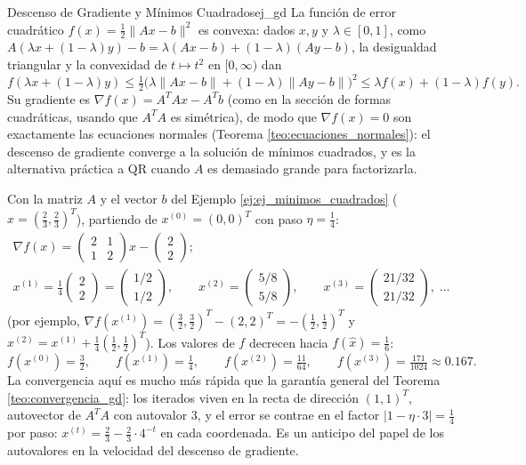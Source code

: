 \documentclass[11pt, a4paper]{article}
\begin{document}
\begin{ejemplo}{Descenso de Gradiente y Mínimos Cuadrados}{ej_gd}
La función de error cuadrático $f(x) = \frac{1}{2} \|Ax - b\|^2$ es convexa: dados $x, y$ y $\lambda \in [0,1]$, como $A(\lambda x + (1-\lambda) y) - b = \lambda (Ax - b) + (1-\lambda)(Ay - b)$, la desigualdad triangular y la convexidad de $t \mapsto t^2$ en $[0, \infty)$ dan
\[
f(\lambda x + (1-\lambda) y) \le \tfrac{1}{2} \big( \lambda \|Ax - b\| + (1-\lambda) \|Ay - b\| \big)^2 \le \lambda f(x) + (1-\lambda) f(y).
\]
Su gradiente es $\nabla f(x) = A^T A x - A^T b$ (como en la sección de formas cuadráticas, usando que $A^T A$ es simétrica), de modo que $\nabla f(x) = 0$ son exactamente las ecuaciones normales (Teorema \ref{teo:ecuaciones_normales}): el descenso de gradiente converge a la solución de mínimos cuadrados, y es la alternativa práctica a QR cuando $A$ es demasiado grande para factorizarla.

Con la matriz $A$ y el vector $b$ del Ejemplo \ref{ej:ej_minimos_cuadrados} ($\hat{x} = (\frac{2}{3}, \frac{2}{3})^T$), partiendo de $x^{(0)} = (0,0)^T$ con paso $\eta = \frac{1}{4}$:
\begin{gather*}
\nabla f(x) = \begin{pmatrix} 2 & 1 \\ 1 & 2 \end{pmatrix} x - \begin{pmatrix} 2 \\ 2 \end{pmatrix};
\\
x^{(1)} = \tfrac{1}{4} \begin{pmatrix} 2 \\ 2 \end{pmatrix} = \begin{pmatrix} 1/2 \\ 1/2 \end{pmatrix}, \qquad
x^{(2)} = \begin{pmatrix} 5/8 \\ 5/8 \end{pmatrix}, \qquad
x^{(3)} = \begin{pmatrix} 21/32 \\ 21/32 \end{pmatrix}, \; \dots
\end{gather*}
(por ejemplo, $\nabla f(x^{(1)}) = (\frac{3}{2}, \frac{3}{2})^T - (2,2)^T = -(\frac{1}{2}, \frac{1}{2})^T$ y $x^{(2)} = x^{(1)} + \frac{1}{4} (\frac{1}{2}, \frac{1}{2})^T$). Los valores de $f$ decrecen hacia $f(\hat{x}) = \frac{1}{6}$:
\[
f(x^{(0)}) = \tfrac{3}{2}, \qquad f(x^{(1)}) = \tfrac{1}{4}, \qquad f(x^{(2)}) = \tfrac{11}{64}, \qquad f(x^{(3)}) = \tfrac{171}{1024} \approx 0.167.
\]
La convergencia aquí es mucho más rápida que la garantía general del Teorema \ref{teo:convergencia_gd}: los iterados viven en la recta de dirección $(1,1)^T$, autovector de $A^T A$ con autovalor $3$, y el error se contrae en el factor $|1 - \eta \cdot 3| = \frac{1}{4}$ por paso: $x^{(t)} = \frac{2}{3} - \frac{2}{3} \cdot 4^{-t}$ en cada coordenada. Es un anticipo del papel de los autovalores en la velocidad del descenso de gradiente.
\end{ejemplo}
\end{document}
